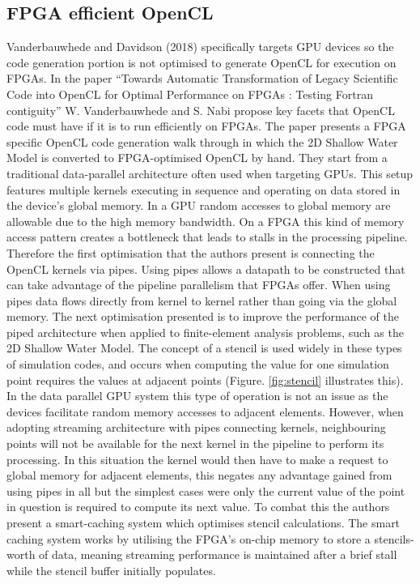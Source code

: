 \documentclass{mpaper}
\begin{document}
\subsection{FPGA efficient OpenCL}

Vanderbauwhede and Davidson (2018) \cite{VanderbauwhedeDavidson2018} specifically targets GPU devices so the code generation portion is not optimised to generate OpenCL for execution on FPGAs. In the paper ``Towards Automatic Transformation of Legacy Scientific Code into OpenCL for Optimal Performance on FPGAs : Testing Fortran contiguity'' \cite{VanderbauwhedeNabi2018} W. Vanderbauwhede and S. Nabi propose key facets that OpenCL code must have if it is to run efficiently on FPGAs. The paper presents a FPGA specific OpenCL code generation walk through in which the 2D Shallow Water Model \cite{Hall2009} is converted to FPGA-optimised OpenCL by hand. They start from a traditional data-parallel architecture often used when targeting GPUs. This setup features multiple kernels executing in sequence and operating on data stored in the device's global memory. In a GPU random accesses to global memory are allowable due to the high memory bandwidth. On a FPGA this kind of memory access pattern creates a bottleneck that leads to stalls in the processing pipeline. Therefore the first optimisation that the authors present is connecting the OpenCL kernels via pipes. Using pipes allows a datapath to be constructed that can take advantage of the pipeline parallelism that FPGAs offer. When using pipes data flows directly from kernel to kernel rather than going via the global memory. The next optimisation presented  is to improve the performance of the piped architecture when applied to finite-element analysis problems, such as the 2D Shallow Water Model. The concept of a stencil is used widely in these types of simulation codes, and occurs when computing the value for one simulation point requires the values at adjacent points (Figure. \ref{fig:stencil} illustrates this). In the data parallel GPU system this type of operation is not an issue as the devices facilitate random memory accesses to adjacent elements. However, when adopting streaming architecture with pipes connecting kernels, neighbouring points will not be available for the next kernel in the pipeline to perform its processing. In this situation the kernel would then have to make a request to global memory for adjacent elements, this negates any advantage gained from using pipes in all but the simplest cases were only the current value of the point in question is required to compute its next value. To combat this the authors present a smart-caching system which optimises stencil calculations. The smart caching system works by utilising the FPGA's on-chip memory to store a stencils-worth of data, meaning streaming performance is maintained after a brief stall while the stencil buffer initially populates.
\end{document}

